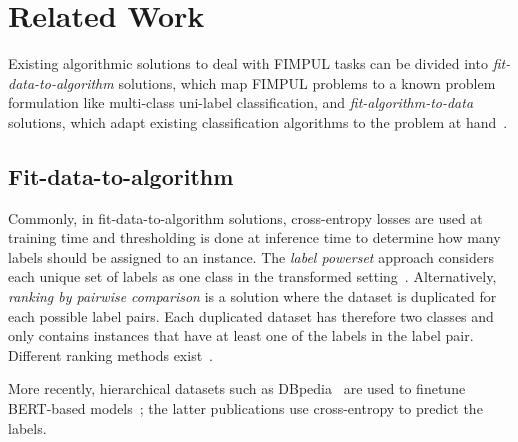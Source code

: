 
\section{Related Work}
\label{sec:org2aceb9f}


Existing algorithmic solutions to deal with FIMPUL tasks can be divided into \emph{fit-data-to-algorithm} solutions, which map FIMPUL problems to a known problem formulation like multi-class uni-label classification, and \emph{fit-algorithm-to-data} solutions, which adapt existing classification
algorithms to the problem at hand~\citep{multilabelMethods}.

\subsection{Fit-data-to-algorithm}
Commonly, in fit-data-to-algorithm solutions, cross-entropy losses are used at training time and thresholding is done at inference time to determine how many labels should be assigned to an instance.
The \textit{label powerset} approach considers each unique set of labels as one class in the transformed setting~\cite{multilabelComparison}.
Alternatively, \textit{ranking by pairwise comparison} is a solution where the dataset is duplicated for each possible label pairs. Each duplicated dataset has therefore two classes and only contains instances that have at least one of the labels in the label pair. Different ranking methods exist~\cite{pairwiseBinary, pairwiseNet}.

More recently, hierarchical datasets such as DBpedia~\citep{lehmann2015dbpedia} are used to finetune BERT-based models~\cite{XLNet, bigBird};  the latter publications use cross-entropy to predict the labels.

